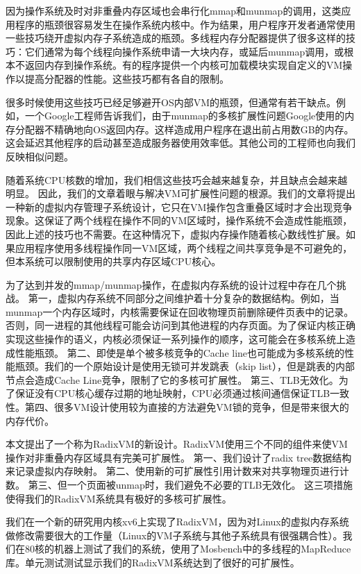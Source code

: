 因为操作系统及时对非重叠内存区域也会串行化mmap和munmap的调用，这类应用程序的瓶颈很容易发生在操作系统内核中。作为结果，用户程序开发者通常使用一些技巧绕开虚拟内存子系统造成的瓶颈。多线程内存分配器提供了很多这样的技巧：它们通常为每个线程向操作系统申请一大块内存，或延后munmap调用，或根本不返回内存到操作系统。有的程序提供一个内核可加载模块实现自定义的VM操作以提高分配器的性能。这些技巧都有各自的限制。

很多时候使用这些技巧已经足够避开OS内部VM的瓶颈，但通常有若干缺点。例如，一个Google工程师告诉我们，由于munmap的多核扩展性问题Google使用的内存分配器不精确地向OS返回内存。这样造成用户程序在退出前占用数GB的内存。这会延迟其他程序的启动甚至造成服务器使用效率低。其他公司的工程师也向我们反映相似问题。

随着系统CPU核数的增加，我们相信这些技巧会越来越复杂，并且缺点会越来越明显。
因此，我们的文章着眼与解决VM可扩展性问题的根源。我们的文章将提出一种新的虚拟内存管理子系统设计，它只在VM操作包含重叠区域时才会出现竞争现象。这保证了两个线程在操作不同的VM区域时，操作系统不会造成性能瓶颈，因此上述的技巧也不需要。在这种情况下，虚拟内存操作随着核心数线性扩展。如果应用程序使用多线程操作同一VM区域，两个线程之间共享竞争是不可避免的，但本系统可以限制使用的共享内存区域CPU核心。

为了达到并发的mmap/munmap操作，在虚拟内存系统的设计过程中存在几个挑战。
第一，虚拟内存系统不同部分之间维护着十分复杂的数据结构。例如，当munmap一个内存区域时，内核需要保证在回收物理页前删除硬件页表中的记录。否则，同一进程的其他线程可能会访问到其他进程的内存页面。为了保证内核正确实现这些操作的语义，内核必须保证一系列操作的顺序，这可能会在多核系统上造成性能瓶颈。
第二、即使是单个被多核竞争的Cache
line也可能成为多核系统的性能瓶颈。我们的一个原始设计是使用无锁可并发跳表（skip
list），但是跳表的内部节点会造成Cache Line竞争，限制了它的多核可扩展性。
第三、TLB无效化。为了保证没有CPU核心缓存过期的地址映射，CPU必须通过核间通信保证TLB一致性。第四、很多VM设计使用较为直接的方法避免VM锁的竞争，但是带来很大的内存代价。

本文提出了一个称为RadixVM的新设计。RadixVM使用三个不同的组件来使VM操作对非重叠内存区域具有完美可扩展性。
第一、我们设计了radix tree数据结构来记录虚拟内存映射。
第二、使用新的可扩展性引用计数来对共享物理页进行计数。
第三、但一个页面被unmap时，我们避免不必要的TLB无效化。
这三项措施使得我们的RadixVM系统具有极好的多核可扩展性。

我们在一个新的研究用内核xv6上实现了RadixVM，因为对Linux的虚拟内存系统做修改需要很大的工作量（Linux的VM子系统与其他子系统具有很强耦合性）。我们在80核的机器上测试了我们的系统，使用了Mosbench中的多线程的MapReduce库。单元测试测试显示我们的RadixVM系统达到了很好的可扩展性。

